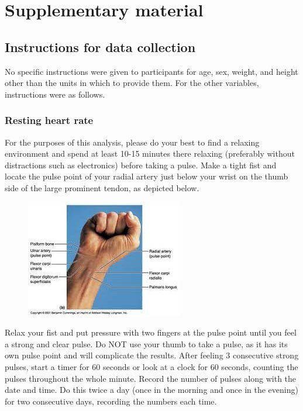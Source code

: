 \documentclass{article}
\begin{document}
\pagebreak
\printbibliography
\pagebreak
\section{Supplementary material}
\subsection{Instructions for data collection}
No specific instructions were given to participants for age, sex, weight, and height other than the units in which to provide them. For the other variables, instructions were as follows.
\subsubsection{Resting heart rate}
For the purposes of this analysis, please do your best to find a relaxing environment and spend at least 10-15 minutes there relaxing (preferably without distractions such as electronics) before taking a pulse. Make a tight fist and locate the pulse point of your radial artery just below your wrist on the thumb side of the large prominent tendon, as depicted below.

\begin{figure}[h!]
\centering
\includegraphics{pics/pulse.jpeg}
\end{figure}

Relax your fist and put pressure with two fingers at the pulse point until you feel a strong and clear pulse. Do NOT use your thumb to take a pulse, as it has its own pulse point and will complicate the results. After feeling 3 consecutive strong pulses, start a timer for 60 seconds or look at a clock for 60 seconds, counting the pulses throughout the whole minute. Record the number of pulses along with the date and time. Do this twice a day (once in the morning and once in the evening) for two consecutive days, recording the numbers each time. 
\end{document}

